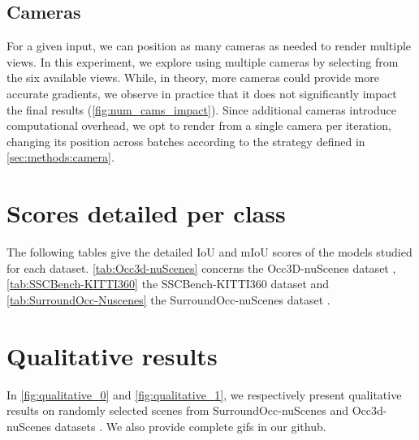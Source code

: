 \subsection{Cameras}
\label{app:ablation:camera}

{
For a given input, we can position as many cameras as needed to render multiple views. In this experiment, we explore using multiple cameras by selecting from the six available views.
While, in theory, more cameras could provide more accurate gradients, we observe in practice that it does not significantly impact the final results (\autoref{fig:num_cams_impact}).
Since additional cameras introduce computational overhead, we opt to render from a single camera per iteration, changing its position across batches according to the strategy defined in \autoref{sec:methods:camera}.
}




\section{Scores detailed per class}
\label{app:results}

The following tables give the detailed IoU and mIoU scores of the models studied for each dataset. \autoref{tab:Occ3d-nuScenes} concerns the Occ3D-nuScenes dataset \cite{tian2023occ3d}, \autoref{tab:SSCBench-KITTI360} the SSCBench-KITTI360 dataset \cite{li2024sscbench} and  \autoref{tab:SurroundOcc-Nuscenes} the SurroundOcc-nuScenes dataset \cite{wei2023surroundocc}. 

\section{Qualitative results}
\label{app:qualitative}
In \autoref{fig:qualitative_0} and \autoref{fig:qualitative_1}, we respectively present qualitative results on randomly selected scenes from SurroundOcc-nuScenes \cite{wei2023surroundocc} and Occ3d-nuScenes datasets \cite{tian2023occ3d}. We also provide complete gifs in our github.







